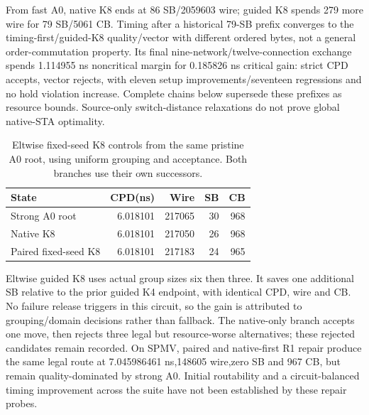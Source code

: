 \documentclass[conference,10pt]{IEEEtran}
\begin{document}
From fast A0, native K8 ends at 86 SB/2059603 wire; guided K8 spends 279 more wire for 79 SB/5061 CB. Timing after a historical 79-SB prefix converges to the timing-first/guided-K8 quality/vector with different ordered bytes, not a general order-commutation property. Its final nine-network/twelve-connection exchange spends 1.114955 ns noncritical margin for 0.185826 ns critical gain: strict CPD accepts, vector rejects, with eleven setup improvements/seventeen regressions and no hold violation increase. Complete chains below supersede these prefixes as resource bounds. Source-only switch-distance relaxations do not prove global native-STA optimality.

\begin{table}[t]
\centering\caption{Eltwise fixed-seed K8 controls from the same pristine A0 root, using uniform grouping and acceptance. Both branches use their own successors.}
\label{tab:eltwise}
\small
\begin{tabular}{lrrrr}\hline
State & CPD(ns) & Wire & SB & CB\\\hline
Strong A0 root &6.018101&217065&30&968\\
Native K8 &6.018101&217050&26&968\\
Paired fixed-seed K8 &6.018101&217183&24&965\\\hline
\end{tabular}
\end{table}
Eltwise guided K8 uses actual group sizes six then three. It saves one additional SB relative to the prior guided K4 endpoint, with identical CPD, wire and CB. No failure release triggers in this circuit, so the gain is attributed to grouping/domain decisions rather than fallback. The native-only branch accepts one move, then rejects three legal but resource-worse alternatives; these rejected candidates remain recorded. On SPMV, paired and native-first R1 repair produce the same legal route at 7.045986461 ns,148605 wire,zero SB and 967 CB, but remain quality-dominated by strong A0. Initial routability and a circuit-balanced timing improvement across the suite have not been established by these repair probes.
\end{document}
